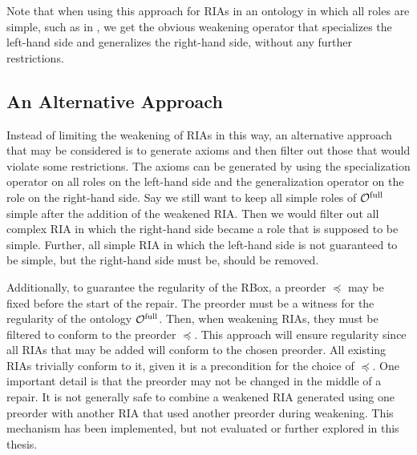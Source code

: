 Note that when using this approach for RIAs in an ontology in which all roles are simple, such as in \ALCH, we get the obvious weakening operator that specializes the left-hand side and generalizes the right-hand side, without any further restrictions.

\subsection{An Alternative Approach}\label{rbox-alternative}

Instead of limiting the weakening of RIAs in this way, an alternative approach that may be considered is to generate axioms and then filter out those that would violate some restrictions. The axioms can be generated by using the specialization operator on all roles on the left-hand side and the generalization operator on the role on the right-hand side. Say we still want to keep all simple roles of ${\mathcal{O}^\textnormal{full}}$ simple after the addition of the weakened RIA. Then we would filter out all complex RIA in which the right-hand side became a role that is supposed to be simple. Further, all simple RIA in which the left-hand side is not guaranteed to be simple, but the right-hand side must be, should be removed.

Additionally, to guarantee the regularity of the RBox, a preorder $\preceq$ may be fixed before the start of the repair. The preorder must be a witness for the regularity of the ontology ${\mathcal{O}^\textnormal{full}}$. Then, when weakening RIAs, they must be filtered to conform to the preorder $\preceq$. This approach will ensure regularity since all RIAs that may be added will conform to the chosen preorder. All existing RIAs trivially conform to it, given it is a precondition for the choice of $\preceq$. One important detail is that the preorder may not be changed in the middle of a repair. It is not generally safe to combine a weakened RIA generated using one preorder with another RIA that used another preorder during weakening. This mechanism has been implemented, but not evaluated or further explored in this thesis.
